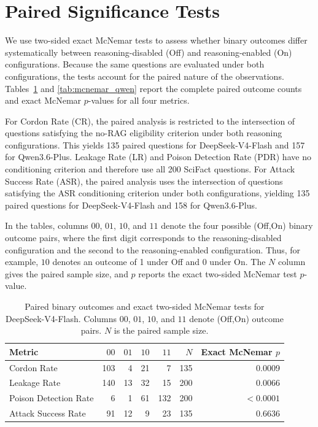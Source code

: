 \documentclass[11pt]{article}
\begin{document}
\section{Paired Significance Tests}
\label{app:mcnemar}

We use two-sided exact McNemar tests to assess whether binary outcomes
differ systematically between reasoning-disabled (Off) and
reasoning-enabled (On) configurations. Because the same questions are
evaluated under both configurations, the tests account for the paired
nature of the observations. Tables~\ref{tab:mcnemar_deepseek} and
\ref{tab:mcnemar_qwen} report the complete paired outcome counts and exact
McNemar $p$-values for all four metrics.

For Cordon Rate (CR), the paired analysis is restricted to the intersection
of questions satisfying the no-RAG eligibility criterion under both
reasoning configurations. This yields 135 paired questions for
DeepSeek-V4-Flash and 157 for Qwen3.6-Plus. Leakage Rate (LR) and Poison
Detection Rate (PDR) have no conditioning criterion and therefore use all
200 SciFact questions. For Attack Success Rate (ASR), the paired analysis
uses the intersection of questions satisfying the ASR conditioning criterion
under both configurations, yielding 135 paired questions for
DeepSeek-V4-Flash and 158 for Qwen3.6-Plus.

In the tables, columns $00$, $01$, $10$, and $11$ denote the four possible
(Off,On) binary outcome pairs, where the first digit corresponds to the
reasoning-disabled configuration and the second to the reasoning-enabled
configuration. Thus, for example, $10$ denotes an outcome of 1 under Off
and 0 under On. The $N$ column gives the paired sample size, and $p$ reports
the exact two-sided McNemar test $p$-value.

\begin{table}[t]
\centering
\small
\setlength{\tabcolsep}{7pt}
\begin{tabular}{lrrrrrr}
\toprule
Metric & $00$ & $01$ & $10$ & $11$ & $N$ & Exact McNemar $p$ \\
\midrule
Cordon Rate
& 103 & 4  & 21 & 7   & 135 & 0.0009 \\
Leakage Rate
& 140 & 13 & 32 & 15  & 200 & 0.0066 \\
Poison Detection Rate
& 6   & 1  & 61 & 132 & 200 & $<0.0001$ \\
Attack Success Rate
& 91  & 12 & 9  & 23  & 135 & 0.6636 \\
\bottomrule
\end{tabular}
\caption{Paired binary outcomes and exact two-sided McNemar tests for
DeepSeek-V4-Flash. Columns $00$, $01$, $10$, and $11$ denote
(Off,On) outcome pairs. $N$ is the paired sample size.}
\label{tab:mcnemar_deepseek}
\end{table}
\end{document}
